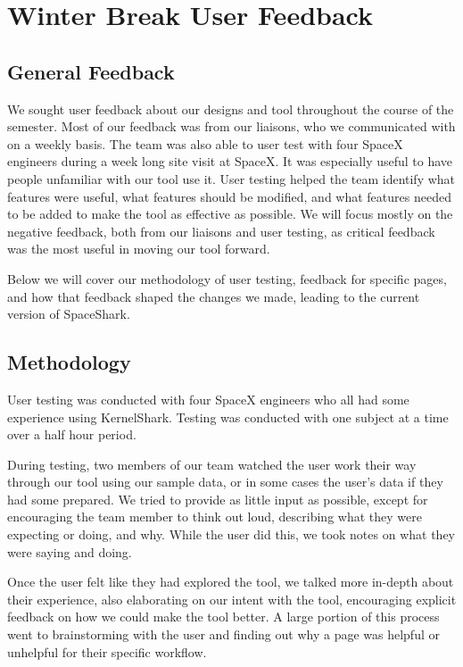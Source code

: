\documentclass{hmcclinic}
\begin{document}


\chapter{Winter Break User Feedback} %
\section{General Feedback} %
We sought user feedback about our designs and tool throughout the course of the
semester. Most of our feedback was from our liaisons, who we communicated with
on a weekly basis. The team was also able to user test with four SpaceX
engineers during a week long site visit at SpaceX. It was especially useful to
have people unfamiliar with our tool use it.  User testing helped the team
identify what features were useful, what features should be modified, and what
features needed to be added to make the tool as effective as possible.  We will
focus mostly on the negative feedback, both from our liaisons and user testing,
as critical feedback was the most useful in moving our tool forward.

Below we will cover our methodology of user testing, feedback for specific
pages, and how that feedback shaped the changes we made, leading to the current
version of SpaceShark.

\section{Methodology} %
User testing was conducted with four SpaceX engineers who all had some
experience using KernelShark. Testing was conducted with one subject
at a time over a half hour period.

During testing, two members of our team watched the user work their way through
our tool using our sample data, or in some cases the user's data if they had
some prepared. We tried to provide as little input as possible, except for
encouraging the team member to think out loud, describing what they were
expecting or doing, and why. While the user did this, we took notes on what they
were saying and doing.

Once the user felt like they had explored the tool, we talked more in-depth
about their experience, also elaborating on our intent with the tool,
encouraging explicit feedback on how we could make the tool better. A large
portion of this process went to brainstorming with the user and finding out why
a page was helpful or unhelpful for their specific workflow.
\end{document}
